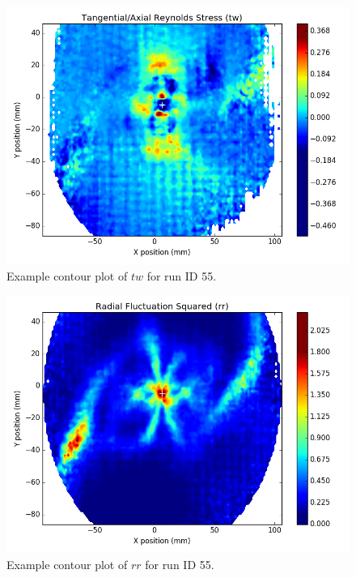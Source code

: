 \begin{figure}[H]
	\centering
	\includegraphics[width=5in]{figs/example_vortex_figs/example_tw_contour}
\caption{Example contour plot of $tw$ for run ID 55.}
\label{fig:examp_tw}
\end{figure}

\begin{figure}[H]
	\centering
	\includegraphics[width=5in]{figs/example_vortex_figs/example_rr_contour}
\caption{Example contour plot of $rr$ for run ID 55.}
\label{fig:examp_rr}
\end{figure}

